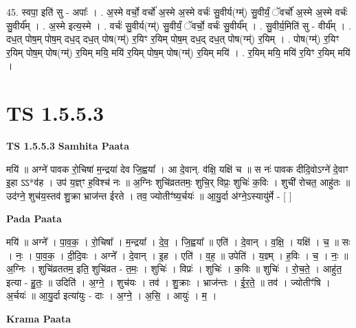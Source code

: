 \documentclass[17pt]{extarticle}
\begin{document}
45. स्वपा॒ इति॑ सु - अपाः᳚ । . अ॒स्मे वर्चो॒ वर्चो॑ अ॒स्मे अ॒स्मे वर्चः॑ सु॒वीर्य(ग्म्॑) सु॒वीर्यं॒ ॅवर्चो॑ अ॒स्मे अ॒स्मे वर्चः॑ सु॒वीर्य᳚म् । . अ॒स्मे इत्य॒स्मे । . वर्चः॑ सु॒वीर्य(ग्म्॑) सु॒वीर्यं॒ ॅवर्चो॒ वर्चः॑ सु॒वीर्य᳚म् । . सु॒वीर्य॒मिति॑ सु - वीर्य᳚म् । . दध॒त् पोष॒म् पोष॒म् दध॒द् दध॒त् पोष(ग्म्॑) र॒यिꣳ र॒यिम् पोष॒म् दध॒द् दध॒त् पोष(ग्म्॑) र॒यिम् । . पोष(ग्म्॑) र॒यिꣳ र॒यिम् पोष॒म् पोष(ग्म्॑) र॒यिम् मयि॒ मयि॑ र॒यिम् पोष॒म् पोष(ग्म्॑) र॒यिम् मयि॑ । . र॒यिम् मयि॒ मयि॑ र॒यिꣳ र॒यिम् मयि॑ । \newline
\pagebreak
{}
\section*{ TS 1.5.5.3 }

\textbf{TS 1.5.5.3 } \newline
\textbf{Samhita Paata} \newline

मयि॑ ॥ अग्ने॑ पावक रो॒चिषा॑ म॒न्द्रया॑ देव जि॒ह्वया᳚ । आ दे॒वान्. व॑क्षि॒ यक्षि॑ च ॥ स नः॑ पावक दीदि॒वोऽग्ने॑ दे॒वाꣳ इ॒हा ऽऽ*व॑ह । उप॑ य॒ज्ञ्ꣳ ह॒विश्च॑ नः ॥ अ॒ग्निः शुचि॑व्रततमः॒ शुचि॒र् विप्रः॒ शुचिः॑ क॒विः । शुची॑ रोचत॒ आहु॑तः ॥ उद॑ग्ने॒ शुच॑य॒स्तव॑ शु॒क्रा भ्राज॑न्त ईरते । तव॒ ज्योतीꣳ॑ष्य॒र्चयः॑ ॥ आ॒यु॒र्दा अ॑ग्ने॒ऽस्यायु॑र्मे - [ ] \newline

\textbf{Pada Paata} \newline

मयि॑ ॥ अग्ने᳚ । पा॒व॒क॒ । रो॒चिषा᳚ । म॒न्द्रया᳚ । दे॒व॒ । जि॒ह्वया᳚ ॥ एति॑ । दे॒वान् । व॒क्षि॒ । यक्षि॑ । च॒ ॥ सः । नः॒ । पा॒व॒क॒ । दी॒दि॒वः । अग्ने᳚ । दे॒वान् । इ॒ह । एति॑ । व॒ह॒ ॥ उपेति॑ । य॒ज्ञ्म् । ह॒विः । च॒ । नः॒ ॥ अ॒ग्निः । शुचि॑व्रततम॒ इति॒ शुचि॑व्रत - त॒मः॒ । शुचिः॑ । विप्रः॑ । शुचिः॑ । क॒विः ॥ शुचिः॑ । रो॒च॒ते॒ । आहु॑त॒ इत्या - हु॒तः॒ ॥ उदिति॑ । अ॒ग्ने॒ । शुच॑यः । तव॑ । शु॒क्राः । भ्राज॑न्तः । ई॒र॒ते॒ ॥ तव॑ । ज्योतीꣳ॑षि । अ॒र्चयः॑ ॥ आ॒यु॒र्दा इत्या॑युः - दाः । अ॒ग्ने॒ । अ॒सि॒ । आयुः॑ । म॒ ।  \newline


\textbf{Krama Paata} \newline
\end{document}
